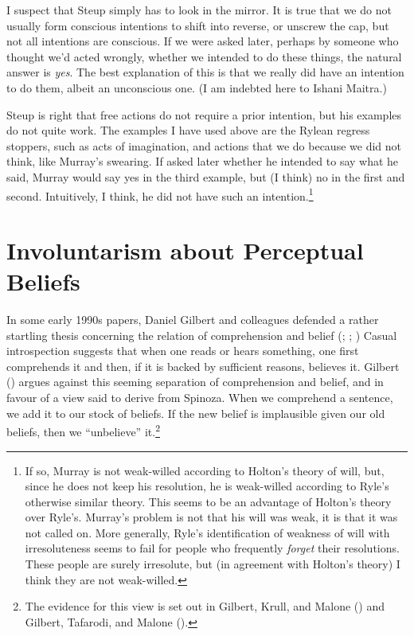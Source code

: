 \documentclass[
  11pt,
  letterpaper,
  DIV=11,
  numbers=noendperiod,
  twoside]{scrartcl}
\begin{document}
I suspect that Steup simply has to look in the mirror. It is true that
we do not usually form conscious intentions to shift into reverse, or
unscrew the cap, but not all intentions are conscious. If we were asked
later, perhaps by someone who thought we'd acted wrongly, whether we
intended to do these things, the natural answer is \emph{yes}. The best
explanation of this is that we really did have an intention to do them,
albeit an unconscious one. (I am indebted here to Ishani Maitra.)

Steup is right that free actions do not require a prior intention, but
his examples do not quite work. The examples I have used above are the
Rylean regress stoppers, such as acts of imagination, and actions that
we do because we did not think, like Murray's swearing. If asked later
whether he intended to say what he said, Murray would say yes in the
third example, but (I think) no in the first and second. Intuitively, I
think, he did not have such an intention.\footnote{If so, Murray is not
  weak-willed according to Holton's theory of will, but, since he does
  not keep his resolution, he is weak-willed according to Ryle's
  otherwise similar theory. This seems to be an advantage of Holton's
  theory over Ryle's. Murray's problem is not that his will was weak, it
  is that it was not called on. More generally, Ryle's identification of
  weakness of will with irresoluteness seems to fail for people who
  frequently \emph{forget} their resolutions. These people are surely
  irresolute, but (in agreement with Holton's theory) I think they are
  not weak-willed.}

\section{Involuntarism about Perceptual
Beliefs}\label{involuntarism-about-perceptual-beliefs}

In some early 1990s papers, Daniel Gilbert and colleagues defended a
rather startling thesis concerning the relation of comprehension and
belief (; ;
) Casual introspection suggests that when one reads or hears
something, one first comprehends it and then, if it is backed by
sufficient reasons, believes it. Gilbert
() argues against this seeming
separation of comprehension and belief, and in favour of a view said to
derive from Spinoza. When we comprehend a sentence, we add it to our
stock of beliefs. If the new belief is implausible given our old
beliefs, then we ``unbelieve'' it.\footnote{The evidence for this view
  is set out in Gilbert, Krull, and Malone
  () and Gilbert, Tafarodi,
  and Malone ().}
\end{document}
